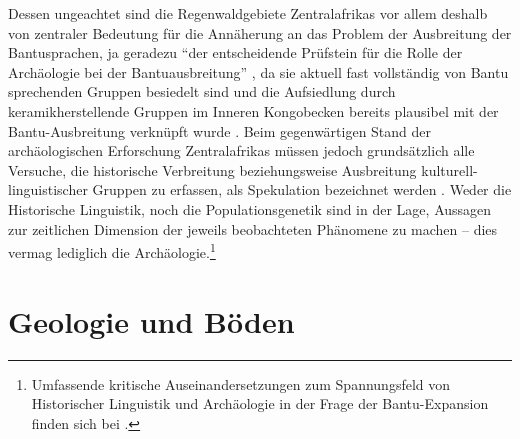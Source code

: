 \begin{multicols}{2}
Dessen ungeachtet sind die Regenwaldgebiete Zentralafrikas vor allem deshalb von zentraler Bedeutung für die Annäherung an das Problem der Ausbreitung der Bantusprachen, ja geradezu \enquote{der entscheidende Prüfstein für die Rolle der Archäologie bei der Bantuausbreitung} \parencite[207]{Eggert.2012}, da sie aktuell fast vollständig von Bantu sprechenden Gruppen besiedelt sind und die Aufsiedlung durch keramikherstellende Gruppen im Inneren Kongobecken bereits plausibel mit der Bantu-Ausbreitung verknüpft wurde \parencite[244--246]{Wotzka.1995}. Beim gegenwärtigen Stand der archäologischen Erforschung Zentralafrikas müssen jedoch grundsätzlich alle Versuche, die historische Verbreitung beziehungsweise Ausbreitung kulturell-linguistischer Gruppen zu erfassen, als Spekulation bezeichnet werden \parencite[105]{Boyd.2007}. Weder die Historische Linguistik, noch die Populationsgenetik sind in der Lage, Aussagen zur zeitlichen Dimension der jeweils beobachteten Phänomene zu machen \parencite[84]{Eggert.2016c} -- dies vermag lediglich die Archäologie.\footnote{Umfassende kritische Auseinandersetzungen zum Spannungsfeld von Historischer Linguistik und Archäologie in der Frage der Bantu-Expansion finden sich bei \textcites{Eggert.2005}{Eggert.2012}{Eggert.2012c}{Eggert.2016c}.}


\section{Geologie und Böden}


\end{multicols}
